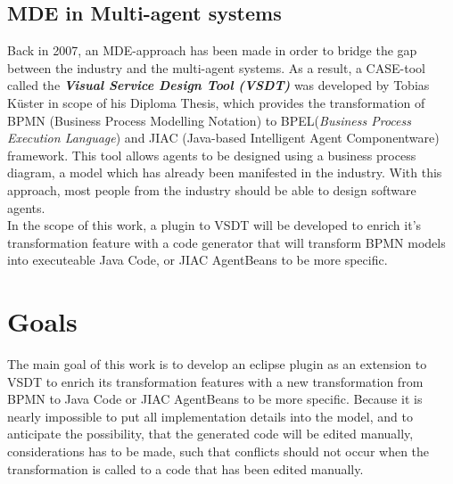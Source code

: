 \subsection{MDE in Multi-agent systems}
Back in 2007, an MDE-approach has been made in order to bridge the gap between the industry and the multi-agent systems. As a result, a CASE-tool called the \textbf{\textit{Visual Service Design Tool (VSDT)}} was developed by Tobias K\"uster in scope of his Diploma Thesis, which provides the transformation of BPMN (Business Process Modelling Notation) to BPEL(\textit{Business Process Execution Language}) and JIAC (Java-based Intelligent Agent Componentware) framework. This tool allows agents to be designed using a business process diagram, a model which has already been manifested in the industry. With this approach, most people from the industry should be able to design software agents.\\

In the scope of this work, a plugin to VSDT will be developed to enrich it's transformation feature with a code generator that will transform BPMN models into executeable Java Code, or JIAC AgentBeans to be more specific. 

\section{Goals}
\label{sec:Goals}
The main goal of this work is to develop an eclipse plugin as an extension to VSDT to enrich its transformation features with a new transformation from BPMN to Java Code or JIAC AgentBeans to be more specific. Because it is nearly impossible to put all implementation  details into the model, and to anticipate the possibility, that the generated code will be edited manually, considerations has to be made, such that conflicts should not occur when the transformation is called to a code that has been edited manually. 


